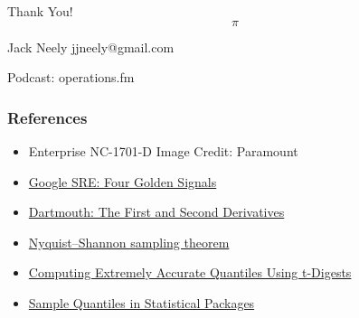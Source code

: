 \begin{frame}[standout]
    Thank You!
    $$\pi$$

    \small
    Jack Neely
    jjneely@gmail.com

    Podcast: operations.fm
\end{frame}

\appendix

\begin{frame}
    \frametitle{References}

    \begin{itemize}
        \item Enterprise NC-1701-D Image Credit: Paramount
        \item \href{https://sre.google/sre-book/monitoring-distributed-systems/}{\alert{Google SRE: Four Golden Signals}}
        \item \href{https://math.dartmouth.edu/opencalc2/cole/lecture8.pdf}{\alert{Dartmouth: The First and Second Derivatives}}
        \item \href{https://en.wikipedia.org/wiki/Nyquist\%E2\%80\%93Shannon_sampling_theorem}{\alert{Nyquist–Shannon sampling theorem}}
        \item \href{https://github.com/tdunning/t-digest/blob/main/docs/t-digest-paper/histo.pdf}{\alert{Computing Extremely Accurate Quantiles Using t-Digests}}
        \item \href{https://www.researchgate.net/publication/222105754_Sample_Quantiles_in_Statistical_Packages}{\alert{Sample Quantiles in Statistical Packages}}
    \end{itemize}
\end{frame}

